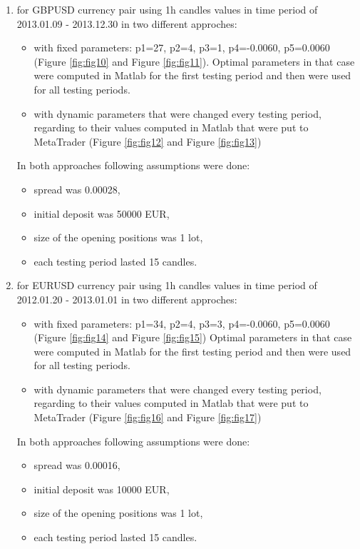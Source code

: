 \documentclass[runningheads,a4paper]{llncs}
\begin{document}
\begin{enumerate}
\item for GBPUSD currency pair using 1h candles values in time period of 2013.01.09 - 2013.12.30 in two different approches:
\begin{itemize}
\item with fixed parameters: p1=27, p2=4, p3=1, p4=-0.0060, p5=0.0060 (Figure \ref{fig:fig10} and Figure \ref{fig:fig11}). Optimal parameters in that case were computed in Matlab for the first testing period and then were used for all testing periods.
\item with dynamic parameters that were changed every testing period, regarding to their values computed in Matlab that were put to MetaTrader (Figure \ref{fig:fig12} and Figure \ref{fig:fig13})
\end{itemize}
In both approaches following assumptions were done:
\begin{itemize}
\item spread was 0.00028, 
\item initial deposit was 50000 EUR,
\item size of the opening positions was 1 lot,
\item each testing period lasted 15 candles.
\end{itemize}
\item for EURUSD currency pair using 1h candles values in time period of 2012.01.20 - 2013.01.01 in two different approches:
\begin{itemize}
\item with fixed parameters: p1=34, p2=4, p3=3, p4=-0.0060, p5=0.0060 (Figure \ref{fig:fig14} and Figure \ref{fig:fig15}) Optimal parameters in that case were computed in Matlab for the first testing period and then were used for all testing periods.
\item with dynamic parameters that were changed every testing period, regarding to their values computed in Matlab that were put to MetaTrader (Figure \ref{fig:fig16} and Figure \ref{fig:fig17})
\end{itemize}
In both approaches following assumptions were done:
\begin{itemize}
\item spread was 0.00016, 
\item initial deposit was 10000 EUR,
\item size of the opening positions was 1 lot,
\item each testing period lasted 15 candles.
\end{itemize}
\end{enumerate}
\end{document}

